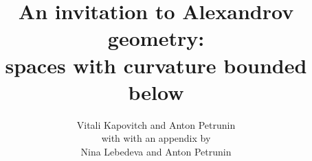 \documentclass[twoside]{book}
\newcommand{\spell}[2]{#2} %
\def\thetitle{An invitation to Alexandrov geometry:\\
spaces with curvature bounded below}
\def\theauthors{Vitali Kapovitch and Anton Petrunin}
\begin{document}
\spell{\pagestyle{empty}\renewcommand\includegraphics[2][{}]{}\renewcommand\emph[1]{#1}}{}

\frontmatter
\title{\thetitle}
\author{\theauthors\\
with with an appendix by\\
Nina Lebedeva and Anton Petrunin}
\date{}
\maketitle
\thispagestyle{empty}
\newpage
\tableofcontents

\mainmatter





%











%



\appendix




%

\backmatter



{


\def\emph{\textit}

\printbibliography[heading=bibintoc]
\fussy
}
\end{document}
